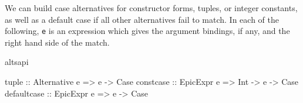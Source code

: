 
\noindent
We can build case alternatives for constructor forms, tuples, or
integer constants, as well as a default case if all other alternatives
fail to match. In each of the following, \texttt{e} is an expression
which gives the argument bindings, if any, and the right hand side of
the match.


\begin{SaveVerbatim}{altsapi}

tuple       :: Alternative e =>        e -> Case
constcase   :: EpicExpr e    => Int -> e -> Case
defaultcase :: EpicExpr e    =>        e -> Case

\end{SaveVerbatim}

